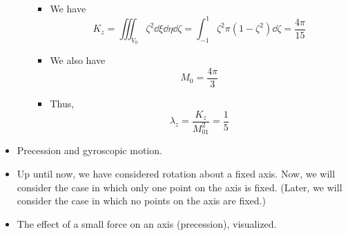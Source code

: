 \documentclass[../notes.tex]{subfiles}
\begin{document}
\begin{itemize}
\begin{itemize}
        \begin{itemize}
            \item We have
            \begin{equation*}
                K_z = \iiint_{V_0}\zeta^2\dd{\xi}\dd{\eta}\dd{\zeta}
                = \int_{-1}^1\zeta^2\pi(1-\zeta^2)\dd{\zeta}
                = \frac{4\pi}{15}
            \end{equation*}
            \item We also have
            \begin{equation*}
                M_0 = \frac{4\pi}{3}
            \end{equation*}
            \item Thus,
            \begin{equation*}
                \lambda_z = \frac{K_z}{M_01^2}
                = \frac{1}{5}
            \end{equation*}
        \end{itemize}
    \end{itemize}
    \item Precession and gyroscopic motion.
    \item Up until now, we have considered rotation about a fixed axis. Now, we will consider the case in which only one point on the axis is fixed. (Later, we will consider the case in which no points on the axis are fixed.)
    \item The effect of a small force on an axis (precession), visualized.
    \begin{figure}[H]
        \centering
\end{figure}
\end{itemize}
\end{document}
